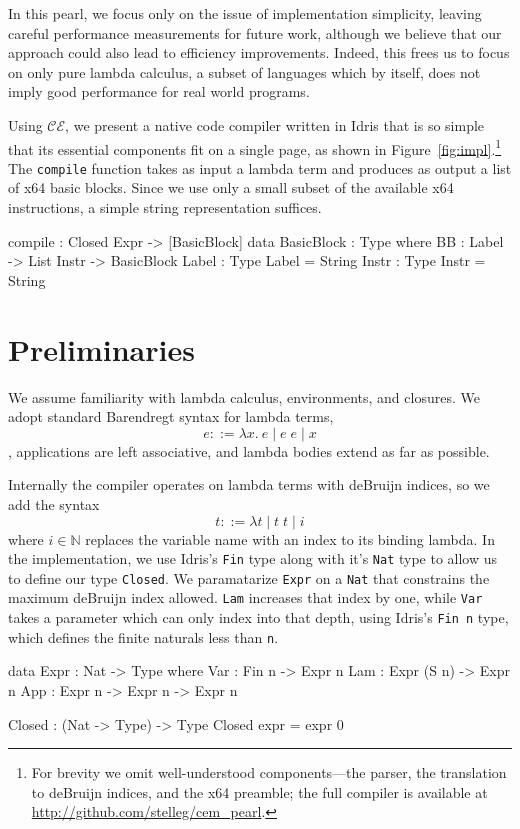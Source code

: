 \documentclass[preprint]{sigplanconf}
\begin{document}
In this pearl, we focus only on the issue of implementation simplicity, leaving
careful performance measurements for future work, although we believe that our
approach could also lead to efficiency improvements. Indeed, this frees us to
focus on only pure lambda calculus, a subset of languages which by itself, does
not imply good performance for real world programs.

Using $\mathcal{CE}$, we present a native code compiler written in Idris that is
so simple that its essential components fit on a single page, as shown in
Figure~\ref{fig:impl}.\footnote{For brevity we omit well-understood
components---the parser, the translation to deBruijn indices, and the x64
preamble; the full compiler is available at
\url{http://github.com/stelleg/cem_pearl}.} The \texttt{compile} function takes
as input a lambda term and produces as output a list of x64 basic blocks. Since
we use only a small subset of the available x64 instructions, a simple string
representation suffices.

\begin{code}
compile : Closed Expr -> [BasicBlock]
data BasicBlock : Type where
  BB : Label -> List Instr -> BasicBlock
Label : Type
Label = String
Instr : Type
Instr = String 
\end{code}

\section{Preliminaries}
We assume familiarity with lambda calculus, environments, and closures.
We adopt standard Barendregt syntax \cite{barendregt1984lambda} for lambda
terms, $$ e ::=  \lambda x.\ e \; | \; e \;  e \; | \; x $$, applications are
left associative, and lambda bodies extend as far as possible. 

Internally the compiler operates on lambda terms with deBruijn indices,
so we add the syntax $$ t ::= \lambda t \; | \; t \;
t \; | \; i $$ where $i \in \mathbb{N}$ replaces the variable name with an index
to its binding lambda. In the implementation, we use Idris's \texttt{Fin} type
along with it's \texttt{Nat} type to allow us to define our type
\texttt{Closed}. We paramatarize \texttt{Expr} on a \texttt{Nat} that constrains
the maximum deBruijn index allowed. \texttt{Lam} increases that index by one,
while \texttt{Var} takes a parameter which can only index into that depth, using
Idris's \texttt{Fin n} type, which defines the finite naturals less than
\texttt{n}. 

\begin{code}
data Expr : Nat -> Type where
  Var : Fin n -> Expr n
  Lam : Expr (S n) -> Expr n 
  App : Expr n -> Expr n -> Expr n

Closed : (Nat -> Type) -> Type
Closed expr = expr 0
\end{code}
\end{document}
